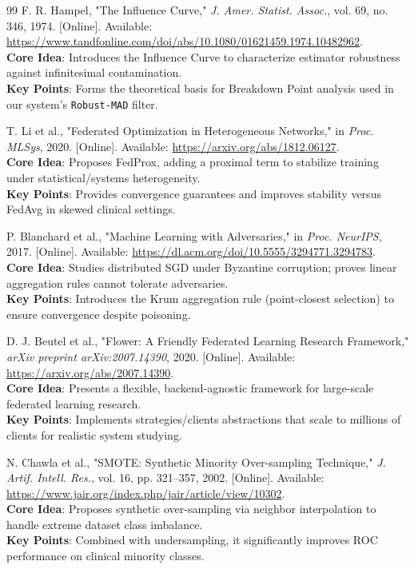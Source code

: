 \documentclass[10pt, a4paper, twocolumn]{article}
\begin{document}
\begin{thebibliography}{99}
 F. R. Hampel, "The Influence Curve," \textit{J. Amer. Statist. Assoc.}, vol. 69, no. 346, 1974. [Online]. Available: \url{https://www.tandfonline.com/doi/abs/10.1080/01621459.1974.10482962}. \\
\textbf{Core Idea}: Introduces the Influence Curve to characterize estimator robustness against infinitesimal contamination. \\
\textbf{Key Points}: Forms the theoretical basis for Breakdown Point analysis used in our system's \texttt{Robust-MAD} filter.

 T. Li et al., "Federated Optimization in Heterogeneous Networks," in \textit{Proc. MLSys}, 2020. [Online]. Available: \url{https://arxiv.org/abs/1812.06127}. \\
\textbf{Core Idea}: Proposes FedProx, adding a proximal term to stabilize training under statistical/systems heterogeneity. \\
\textbf{Key Points}: Provides convergence guarantees and improves stability versus FedAvg in skewed clinical settings.

 P. Blanchard et al., "Machine Learning with Adversaries," in \textit{Proc. NeurIPS}, 2017. [Online]. Available: \url{https://dl.acm.org/doi/10.5555/3294771.3294783}. \\
\textbf{Core Idea}: Studies distributed SGD under Byzantine corruption; proves linear aggregation rules cannot tolerate adversaries. \\
\textbf{Key Points}: Introduces the Krum aggregation rule (point-closest selection) to ensure convergence despite poisoning.

 D. J. Beutel et al., "Flower: A Friendly Federated Learning Research Framework," \textit{arXiv preprint arXiv:2007.14390}, 2020. [Online]. Available: \url{https://arxiv.org/abs/2007.14390}. \\
\textbf{Core Idea}: Presents a flexible, backend-agnostic framework for large-scale federated learning research. \\
\textbf{Key Points}: Implements strategies/clients abstractions that scale to millions of clients for realistic system studying.

 N. Chawla et al., "SMOTE: Synthetic Minority Over-sampling Technique," \textit{J. Artif. Intell. Res.}, vol. 16, pp. 321–357, 2002. [Online]. Available: \url{https://www.jair.org/index.php/jair/article/view/10302}. \\
\textbf{Core Idea}: Proposes synthetic over-sampling via neighbor interpolation to handle extreme dataset class imbalance. \\
\textbf{Key Points}: Combined with undersampling, it significantly improves ROC performance on clinical minority classes.


\end{thebibliography}
\end{document}
